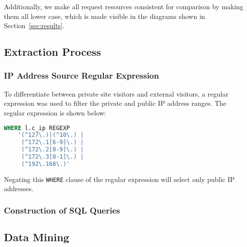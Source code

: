 Additionally, we make all request resources consistent for comparison by making them all lower case, which is made visible in the diagrams shown in Section~\ref{sec:results}.

\subsection{Extraction Process}
\label{sec:method:extraction_process}

\subsubsection{IP Address Source Regular Expression}
\label{sec:method:extraction_process:ip_regex}

To differentiate between private site visitors and external visitors, a regular expression was used to filter the private and public IP address ranges. The regular expression is shown below:

\begin{lstlisting}[language=SQL, xleftmargin=2cm]
WHERE l.c_ip REGEXP 
	'(^127\.)|(^10\.) | 
	 (^172\.1[6-9]\.) |
	 (^172\.2[0-9]\.) |
	 (^172\.3[0-1]\.) |
	 (^192\.168\.)'
\end{lstlisting}

Negating this \texttt{WHERE} clause of the regular expression will select only public IP addresses.

\subsubsection{Construction of SQL Queries}
\label{sec:method:extraction_process:sql_queries}


\subsection{Data Mining}

